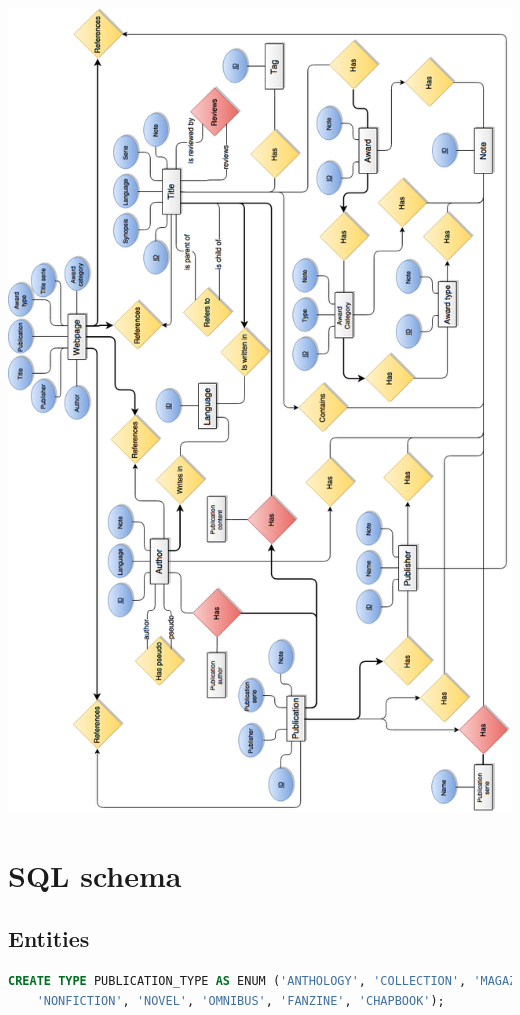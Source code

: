 \documentclass[doubleside, titlepage]{article}
\begin{document}
\newpage

\begin{center}
    \includegraphics[scale = 0.5]{DBMS_ER_OLD}
\end{center}

\section{SQL schema}

\subsection{Entities}

\begin{lstlisting}[language=SQL,showspaces=false,basicstyle=\ttfamily,numberstyle=\tiny,commentstyle=\color{gray}
        ]
CREATE TYPE PUBLICATION_TYPE AS ENUM ('ANTHOLOGY', 'COLLECTION', 'MAGAZINE',
	'NONFICTION', 'NOVEL', 'OMNIBUS', 'FANZINE', 'CHAPBOOK');
\end{lstlisting}
\end{document}
